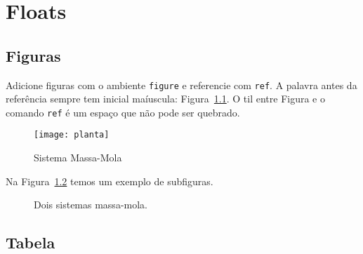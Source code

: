 
\chapter{Floats}
\section{Figuras}

Adicione figuras com o ambiente \texttt{figure} e referencie com \texttt{ref}. A
palavra antes da referência sempre tem inicial maíuscula: Figura~\ref{fig:smm1}.
O til entre Figura e o comando \texttt{ref} é um espaço que não pode ser
quebrado.

\begin{figure}[ht!] %
  \centering %
  \texttt{[image: planta]}
  \caption{Sistema Massa-Mola}%
  \label{fig:smm1}
\end{figure}

Na Figura~\ref{fig:smm2} temos um exemplo de subfiguras.

\begin{figure}[ht!]
  \centering
  \qquad
  \caption{Dois sistemas massa-mola.}%
  \label{fig:smm2}
\end{figure}

\FloatBarrier %

\section{Tabela}

